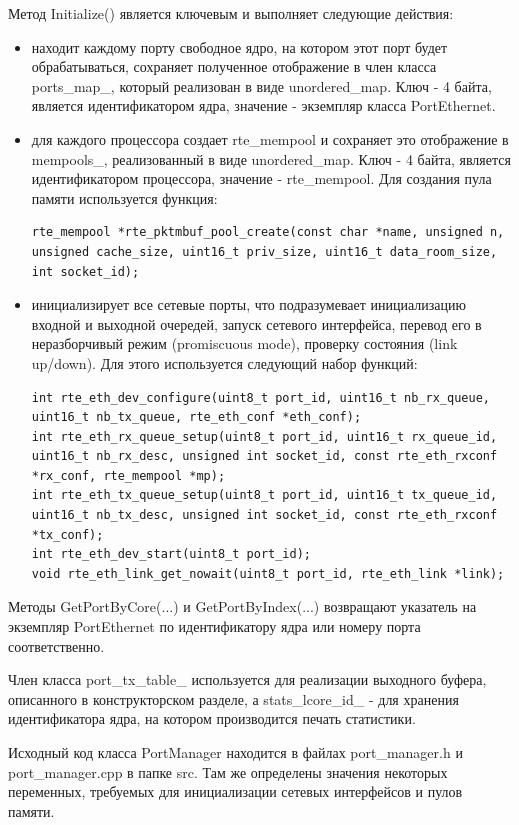 Метод Initialize() является ключевым и выполняет следующие действия:
\begin{itemize}
\item находит каждому порту свободное ядро, на котором этот порт будет обрабатываться, сохраняет полученное отображение в член класса ports\_map\_, который реализован в виде unordered\_map. Ключ - 4 байта, является идентификатором ядра, значение - экземпляр класса PortEthernet.
\item для каждого процессора создает rte\_mempool и сохраняет это отображение в mempools\_, реализованный в виде unordered\_map. Ключ - 4 байта, является идентификатором процессора, значение - rte\_mempool. Для создания пула памяти используется функция:
\begin{lstlisting}
rte_mempool *rte_pktmbuf_pool_create(const char *name, unsigned n, unsigned cache_size, uint16_t priv_size, uint16_t data_room_size, int socket_id);
\end{lstlisting}
\item инициализирует все сетевые порты, что подразумевает инициализацию входной и выходной очередей, запуск сетевого интерфейса, перевод его в неразборчивый режим (promiscuous mode), проверку состояния (link up/down). Для этого используется следующий набор функций:
\begin{lstlisting}
int rte_eth_dev_configure(uint8_t port_id, uint16_t nb_rx_queue, uint16_t nb_tx_queue, rte_eth_conf *eth_conf);
int rte_eth_rx_queue_setup(uint8_t port_id, uint16_t rx_queue_id, uint16_t nb_rx_desc, unsigned int socket_id, const rte_eth_rxconf *rx_conf, rte_mempool *mp);
int rte_eth_tx_queue_setup(uint8_t port_id, uint16_t tx_queue_id, uint16_t nb_tx_desc, unsigned int socket_id, const rte_eth_rxconf *tx_conf);
int rte_eth_dev_start(uint8_t port_id);
void rte_eth_link_get_nowait(uint8_t port_id, rte_eth_link *link);
\end{lstlisting}
\end{itemize}

Методы GetPortByCore(...) и GetPortByIndex(...) возвращают указатель на экземпляр PortEthernet по идентификатору ядра или номеру порта соответственно.

Член класса port\_tx\_table\_ используется для реализации выходного буфера, описанного в конструкторском разделе, а stats\_lcore\_id\_ - для хранения идентификатора ядра, на котором производится печать статистики.

Исходный код класса PortManager находится в файлах port\_manager.h и port\_manager.cpp в папке src. Там же определены значения некоторых переменных, требуемых для инициализации сетевых интерфейсов и пулов памяти.

